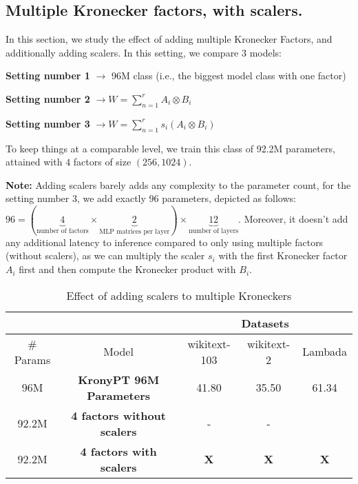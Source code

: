 \documentclass{article}
\begin{document}
{\begin{comment}
Convergence starts to emerge starting from 80M models.   80M with single factors is higher than 80M with small dims and high factors.
\end{comment}

\subsection{Multiple Kronecker factors, with scalers.}%
\label{sub:Multiple Kronecker factors, with scalers.}

In this section, we study the effect of adding multiple Kronecker Factors, and additionally adding scalers. In this setting, we compare 3 models:

\textbf{Setting number 1} $\rightarrow$ 96M class (i.e., the biggest model class with one factor)

\textbf{Setting number 2} $\rightarrow W = \sum_{n=1}^{r} A_i \otimes B_i $ 

\textbf{Setting number 3} $\rightarrow W  = \sum_{n=1}^{r} s_i (A_i \otimes B_i)$

To keep things at a comparable level, we train this class of 92.2M parameters, attained with $4$ factors of size $(256, 1024)$. 


\textbf{Note:} Adding scalers barely adds any complexity to the parameter count, for the setting number 3, we add exactly $96$ parameters, depicted as follows: $96 = (\underbrace{4}_{\text{number of factors}} \times \underbrace{2}_{\text{MLP matrices per layer}}) \times \underbrace{12}_{\text{number of layers}}$. Moreover, it doesn't add any additional latency to inference compared to only using multiple factors (without scalers), as we can multiply the scaler $s_i$ with the first Kronecker factor $A_i$ first and then compute the Kronecker product with $B_i$.

\begin{table}[h]
\centering
\begin{tabular}{|c|c|c|c|c|}
\hline
 & & \multicolumn{3}{c|}{Datasets} \\ \hline
\# Params &  Model            & wikitext-103 & wikitext-2 & Lambada \\ \hline
96M       & \textbf{KronyPT 96M Parameters}  & 41.80        & 35.50      & 61.34         \\ \hline
92.2M     & \textbf{4 factors without scalers} & -            & -          &       \\ \hline
92.2M     & \textbf{4 factors with scalers}  &  \textbf{X}   & \textbf{X}      & \textbf{X} \\ \hline
\end{tabular}
\caption{Effect of adding scalers to multiple Kroneckers}


\end{table}}
\end{document}

